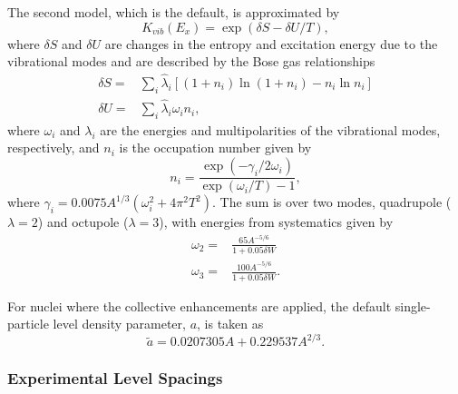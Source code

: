 \documentclass[
10pt,
showpacs,preprintnumbers,footinbib,
amsfonts,amsmath,amssymb,
aps,
prc,twocolumn,groupedaddress,superscriptaddress,
showkeys,
nofootinbib
]{revtex4-1}
\begin{document}
The second model, which is the default, is approximated by~\cite{Capote:2009}
\begin{equation}
K_{vib}(E_x) = \exp(\delta S - \delta U/T),
\end{equation}
where $\delta S$ and $\delta U$ are changes in the entropy and excitation energy due to the vibrational modes and are described by the Bose gas relationships
\begin{align}
\delta S = & \sum_i \hat \lambda_i \left [(1+n_i)\ln(1+n_i)-n_i\ln n_i \right ]\\
\delta U = & \sum_i \hat \lambda_i \omega_i n_i,
\end{align}
where $\omega_i$ and $\lambda_i$ are the energies and multipolarities of the vibrational modes, respectively, and $n_i$ is the occupation number given by
\begin{equation}
n_i = \frac{\exp(-\gamma_i/2\omega_i)}{\exp(\omega_i/T)-1},
\end{equation}
where $\gamma_i = 0.0075A^{1/3}(\omega_i^2+4\pi^2T^2)$. The sum is over two modes, quadrupole ($\lambda = 2$) and octupole ($\lambda=3$), with energies from systematics given by
\begin{align}
\omega_2 =& \frac{65A^{-5/6}}{1+0.05\delta W}\\
\omega_3 =& \frac{100A^{-5/6}}{1+0.05\delta W}.
\end{align}

For nuclei where the collective enhancements are applied, the default single-particle level density parameter, $a$, is taken as~\cite{TALYS}
\begin{equation}
\tilde a = 0.0207305 A + 0.229537 A^{2/3}.
\end{equation}

\subsubsection{Experimental Level Spacings}
\end{document}
